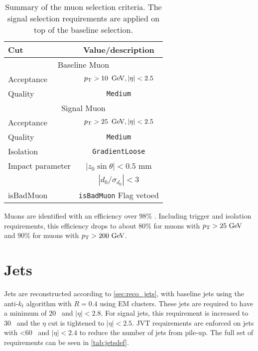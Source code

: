 \begin{table}[ph!]
  \begin{center}
    \begin{tabular}{l|c}
      \hline
      Cut            & Value/description \\
      \hline
      \hline
      \multicolumn{2}{c}{Baseline Muon}\\
      \hline
      Acceptance     & $\pt > 10\,\GeV, |\eta| < 2.5$ \\
      Quality        & \texttt{Medium}    \\
      \hline
      \multicolumn{2}{c}{Signal Muon}\\
      \hline
      Acceptance     & $\pt > 25\,\GeV, |\eta| < 2.5$ \\
      Quality        & \texttt{Medium}    \\
      Isolation        & \texttt{GradientLoose} \\
      Impact parameter & $|z_0 \sin\theta|< 0.5$ mm \\
                       & $|d_0/\sigma_{d_0}|< 3$ \\ 
      isBadMuon        & \texttt{isBadMuon} Flag vetoed \\
      \hline		  
      \hline
    \end{tabular}
  \caption{Summary of the muon selection criteria. The signal selection requirements are applied on top of the baseline selection.}            
    \label{tab:muondef}
  \end{center}
\end{table}

Muons are identified with an efficiency over 98\% \cite{PERF-2015-10}. Including trigger and isolation requirements, this efficiency drops to about 80\% for muons with $\pt>25\gev$ and 90\% for muons with $\pt>200\gev$. %

\section{Jets}

Jets are reconstructed according to \autoref{sec:reco_jets}, with baseline jets using the anti-$k_t$ algorithm with $R=0.4$ using \ac{EM} clusters. These jets are required to have a minimum \pt of 20 \gev~and $|\eta|<2.8$. For signal jets, this \pt requirement is increased to 30 \gev~and the $\eta$ cut is tightened to $|\eta|<2.5$. \ac{JVT} requirements are enforced on jets with \pt<60 \gev~and $|\eta|<2.4$ to reduce the number of jets from pile-up. The full set of requirements can be seen in \autoref{tab:jetsdef}.

